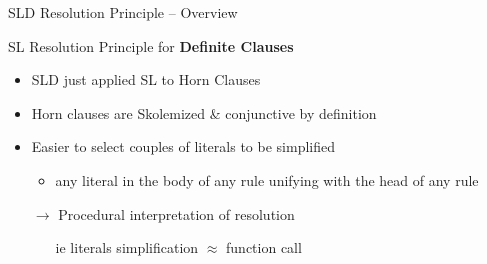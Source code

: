\documentclass[presentation]{beamer}\mode<presentation>{\usetheme{AMSBolognaFC}}
\begin{document}
\begin{frame}{SLD Resolution Principle -- Overview}
    \begin{alertblock}{SL Resolution Principle for \textbf{Definite Clauses}}
        \begin{itemize}
            \item SLD just applied SL to Horn Clauses
            
            \item Horn clauses are Skolemized \& conjunctive \alert{by definition}
            
            \item Easier to select couples of literals to be simplified
            \begin{itemize}
                \item any literal in the \alert{body} of any rule \alert{unifying} with the \alert{head} of any rule
            \end{itemize}

            \item[$\rightarrow$] Procedural interpretation of resolution
            \begin{itemize}
                \item[ie] literals simplification $\approx$ function call
            \end{itemize}
        \end{itemize}
    \end{alertblock}
\end{frame}
\end{document}
